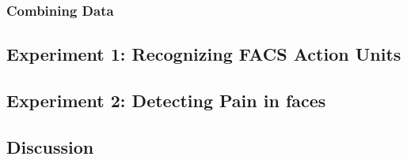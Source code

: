 \documentclass[Main]{subfiles}
\begin{document}








		\subsubsection{Combining Data} %
			\label{ssub:combining_data}
			
		


	\subsection{Experiment 1: Recognizing FACS Action Units} %
		\label{sub:experiment_1_recognizing_facs_action_units}
		


	\subsection{Experiment 2: Detecting Pain in faces} %
		\label{sub:experiment_2_detecting_pain_in_faces}
		


	\subsection{Discussion} %
		\label{sub:discussion}
		

\end{document}
